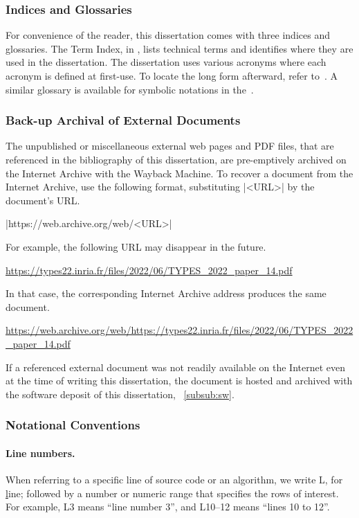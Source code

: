 \subsubsection{Indices and Glossaries}

For convenience of the reader, this dissertation comes with three indices and glossaries.
The Term Index, in , lists technical terms and identifies where they are used in the dissertation.
The dissertation uses various acronyms where each acronym is defined at first-use.
To locate the long form afterward, refer to~.
A similar glossary is available for symbolic notations in the~.

\subsubsection{Back-up Archival of External Documents}

The unpublished or miscellaneous external web pages and PDF files, that are referenced in the bibliography of this dissertation,
are pre-emptively archived on the Internet Archive with the Wayback Machine.
To recover a document from the Internet Archive, use the following format, substituting \pr|<URL>| by the document's URL\@.
\begin{center}
    \pr|https://web.archive.org/web/<URL>|
\end{center}
For example, the following URL may disappear in the future.
\begin{center}
    \url{https://types22.inria.fr/files/2022/06/TYPES_2022_paper_14.pdf}
\end{center}
In that case, the corresponding Internet Archive address produces the same document.
\begin{center}
    \url{https://web.archive.org/web/https://types22.inria.fr/files/2022/06/TYPES_2022_paper_14.pdf}
\end{center}

If a referenced external document was not readily available on the Internet even at the time of writing this dissertation,
the document is hosted and archived with the software deposit of this dissertation, \cf~\autoref{subsub:sw}.

\subsubsection{Notational Conventions}

\paragraph*{Line numbers.}
When referring to a specific line of source code or an algorithm,
we write L, for \underline{l}ine;
followed by a number or numeric range that specifies the rows of interest.
For example, L3 means \enquote{line number 3}, and L10--12 means \enquote{lines 10 to 12}.